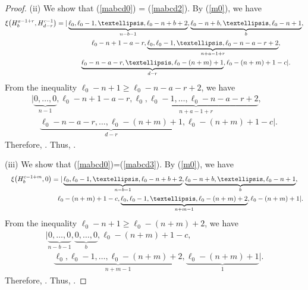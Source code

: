 \documentclass[10pt,a4paper]{amsart}
\begin{document}
\begin{proof}
(ii) We show that (\ref{mabcd0}) = (\ref{mabcd2}). By (\ref{m0}), we have
\begin{gather*}
\xi\bigl(H^{a-1+r}_{b},H^{c-1}_{d-r}\bigr)=|\underbrace{\ell_{0},\ell_{0}-1,\dots,\ell_{0}-n+b+2}_{n-b-1},\underbrace{\ell_{0}-n+b,\dots,\ell_{0}-n+1}_{b},\\
\hphantom{\xi\bigl(H^{a-1+r}_{b},H^{c-1}_{d-r}\bigr)=|}{}
\,\ell_{0}-n+1-a-r,\underbrace{\ell_{0},\ell_{0}-1,\dots,\ell_{0}-n-a-r+2}_{n+a-1+r},\\
\hphantom{\xi\bigl(H^{a-1+r}_{b},H^{c-1}_{d-r}\bigr)=|}{}
\underbrace{\ell_{0}-n-a-r,\dots,\ell_{0}-(n+m)+1}_{d-r},\ell_{0}-(n+m)+1-c|.
\end{gather*}
From the inequality $\ell_0-n+1\geq\ell_0-n-a-r+2$, we have
\begin{gather*}
|\underbrace{0,\dots,0}_{n-1},\ell_{0}-n+1-a-r,\underbrace{\ell_{0},\ell_{0}-1,\dots,\ell_{0}-n-a-r+2}_{n+a-1+r},\nonumber\\
\quad{}\underbrace{\ell_{0}-n-a-r,\dots,\ell_{0}-(n+m)+1}_{d-r},\ell_{0}-(n+m)+1-c|\nonumber.
\end{gather*}
Therefore, . Thus, .


(iii) We show that (\ref{mabcd0})=(\ref{mabcd3}). By (\ref{m0}), we have
\begin{gather*}
\xi\bigl(H^{c-1+m}_{b},0\bigr)=|\underbrace{\ell_{0},\ell_{0}-1,\dots,\ell_{0}-n+b+2}_{n-b-1},%
\underbrace{\ell_{0}-n+b,\dots,\ell_{0}-n+1}_{b},\nonumber\\
\hphantom{\xi\bigl(H^{c-1+m}_{b},0\bigr)=|}{}
\,\ell_{0}-(n+m)+1-c,\underbrace{\ell_{0},\ell_{0}-1,\dots,\ell_{0}-(n+m)+2}_{n+m-1},%
\ell_{0}-(n+m)+1|\nonumber.
\end{gather*}
From the inequality $\ell_{0}-n+1\geq \ell_0-(n+m)+2$, we have
\begin{gather*}
|\underbrace{0,\dots,0}_{n-b-1},
\underbrace{0,\dots,0}_{b},\ell_{0}-(n+m)+1-c,\nonumber\\
\quad{}\underbrace{\ell_{0},\ell_{0}-1,\dots,\ell_{0}-(n+m)+2}_{n+m-1},%
\underbrace{\ell_{0}-(n+m)+1}_{1}|\nonumber.
\end{gather*}
Therefore, . Thus, .


\end{proof}
\end{document}
